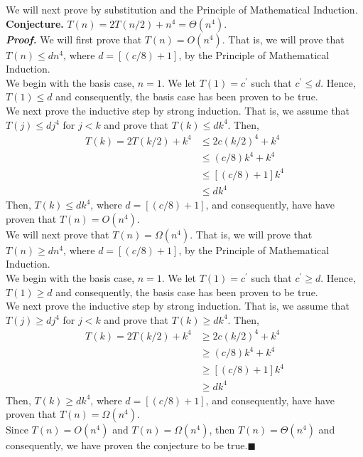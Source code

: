 \documentclass{article}
\begin{document}
\begin{adjustwidth}{2.5em}{0pt}
We will next prove by substitution and the Principle of Mathematical Induction.\\
\textbf{Conjecture.} $T(n) = 2T(n / 2) + n^4 = \Theta(n^4).$\\
\textit{\textbf{Proof.}} We will first prove that $T(n) = O(n^4).$ That is, we will prove that $T(n) \leq dn^4$, where $d = [(c / 8) + 1]$, by the Principle of Mathematical Induction.\\

We begin with the basis case, $n = 1$. We let $T(1) = c^\prime$ such that $c^\prime \leq d$. Hence, $T(1) \leq d$ and consequently, the basis case has been proven to be true.\\

We next prove the inductive step by strong induction. That is, we assume that $T(j) \leq dj^4$ for $j < k$ and prove that $T(k) \leq dk^4$. Then,
\begin{align*}
T(k) = 2T(k / 2) + k^4 &\leq 2c(k / 2)^4 + k^4\\
&\leq (c / 8)k^4 + k^4\\
&\leq [(c / 8) + 1]k^4\\
&\leq dk^4
\end{align*}
Then, $T(k) \leq dk^4$, where $d = [(c / 8) + 1]$, and consequently, have have proven that $T(n) = O(n^4).$\\

We will next prove that $T(n) = \Omega(n^4).$ That is, we will prove that $T(n) \geq dn^4$, where $d = [(c / 8) + 1]$, by the Principle of Mathematical Induction.\\

We begin with the basis case, $n = 1$. We let $T(1) = c^\prime$ such that $c^\prime \geq d$. Hence, $T(1) \geq d$ and consequently, the basis case has been proven to be true.\\

We next prove the inductive step by strong induction. That is, we assume that $T(j) \geq dj^4$ for $j < k$ and prove that $T(k) \geq dk^4$. Then,
\begin{align*}
T(k) = 2T(k / 2) + k^4 &\geq 2c(k / 2)^4 + k^4\\
&\geq (c / 8)k^4 + k^4\\
&\geq [(c / 8) + 1]k^4\\
&\geq dk^4
\end{align*}
Then, $T(k) \geq dk^4$, where $d = [(c / 8) + 1]$, and consequently, have have proven that $T(n) = \Omega(n^4).$\\

Since $T(n) = O(n^4)$ and $T(n) = \Omega(n^4)$, then $T(n) = \Theta(n^4)$ and consequently, we have proven the conjecture to be true.\hfill$\blacksquare$\\
\end{adjustwidth}
\end{document}

